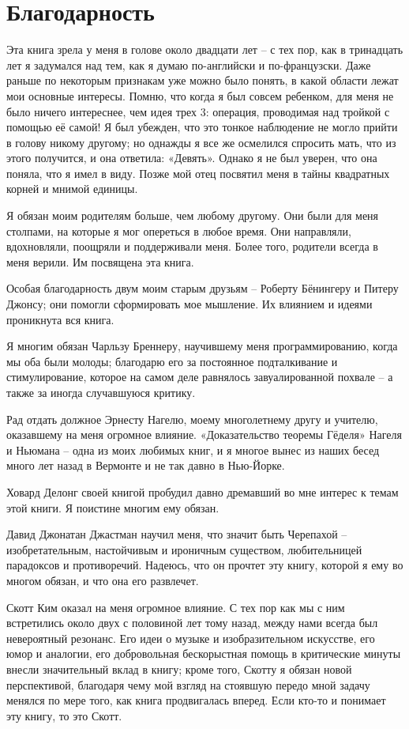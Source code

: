 \documentclass[../main.tex]{subfiles}
\begin{document}
\section{Благодарность}

Эта книга зрела у меня в голове около двадцати лет \--- с тех пор, как в тринадцать лет я задумался над тем, как я думаю по-английски и по-французски. Даже раньше по некоторым признакам уже можно было понять, в какой области лежат мои основные интересы. Помню, что когда я был совсем ребенком, для меня не было ничего интереснее, чем идея трех 3: операция, проводимая над тройкой с помощью её самой! Я был убежден, что это тонкое наблюдение не могло прийти в голову никому другому; но однажды я все же осмелился спросить мать, что из этого получится, и она ответила: «Девять». Однако я не был уверен, что она поняла, что я имел в виду. Позже мой отец посвятил меня в тайны квадратных корней и мнимой единицы.

Я обязан моим родителям больше, чем любому другому. Они были для меня столпами, на которые я мог опереться в любое время. Они направляли, вдохновляли, поощряли и поддерживали меня. Более того, родители всегда в меня верили. Им посвящена эта книга.

Особая благодарность двум моим старым друзьям \--- Роберту Бёнингеру и Питеру Джонсу; они помогли сформировать мое мышление. Их влиянием и идеями проникнута вся книга.

Я многим обязан Чарльзу Бреннеру, научившему меня программированию, когда мы оба были молоды; благодарю его за постоянное подталкивание и стимулирование, которое на самом деле равнялось завуалированной похвале \--- а также за иногда случавшуюся критику.

Рад отдать должное Эрнесту Нагелю, моему многолетнему другу и учителю, оказавшему на меня огромное влияние. «Доказательство теоремы Гёделя» Нагеля и Ньюмана \--- одна из моих любимых книг, и я многое вынес из наших бесед много лет назад в Вермонте и не так давно в Нью-Йорке.

Ховард Делонг своей книгой пробудил давно дремавший во мне интерес к темам этой книги. Я поистине многим ему обязан.

Давид Джонатан Джастман научил меня, что значит быть Черепахой \--- изобретательным, настойчивым и ироничным существом, любительницей парадоксов и противоречий. Надеюсь, что он прочтет эту книгу, которой я ему во многом обязан, и что она его развлечет.

Скотт Ким оказал на меня огромное влияние. С тех пор как мы с ним встретились около двух с половиной лет тому назад, между нами всегда был невероятный резонанс. Его идеи о музыке и изобразительном искусстве, его юмор и аналогии, его добровольная бескорыстная помощь в критические минуты внесли значительный вклад в книгу; кроме того, Скотту я обязан новой перспективой, благодаря чему мой взгляд на стоявшую передо мной задачу менялся по мере того, как книга продвигалась вперед. Если кто-то и понимает эту книгу, то это Скотт.
\end{document}
